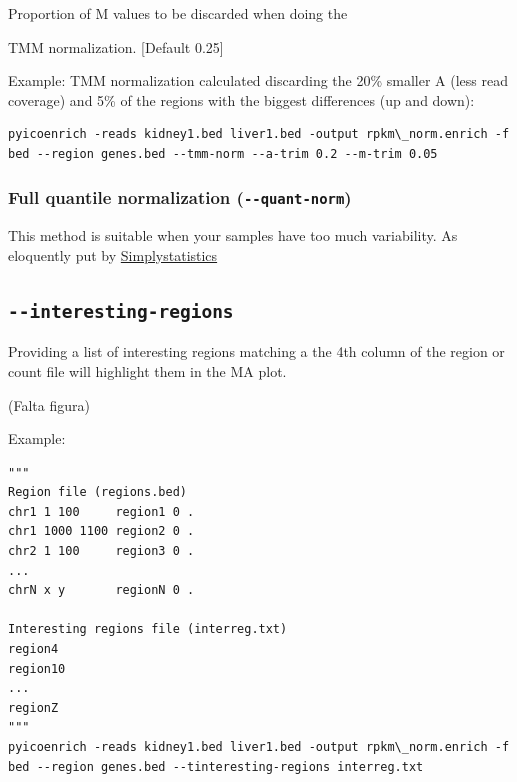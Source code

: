 \documentclass[letterpaper,10pt,english]{sphinxmanual}
\begin{document}

\begin{fulllineitems}
\label{pyicoenrich:cmdoption--m-trim}
Proportion of M values to be discarded when doing the

TMM normalization. {[}Default 0.25{]}

\end{fulllineitems}


Example: TMM normalization calculated discarding the 20\% smaller A (less read coverage) and 5\% of the regions with the biggest differences (up and down):

\begin{Verbatim}[commandchars=\\\{\}]
pyicoenrich -reads kidney1.bed liver1.bed -output rpkm\_norm.enrich -f bed --region genes.bed --tmm-norm --a-trim 0.2 --m-trim 0.05
\end{Verbatim}


\subsubsection{Full quantile normalization (\texttt{-{-}quant-norm})}
\label{pyicoenrich:full-quantile-normalization-quant-norm}
This method is suitable when your samples have too much variability. As eloquently put by \href{http://simplystatistics.org/2013/04/26/mindlessly-normalizing-genomics-data-is-bad-but-ignoring-unwanted-variability-can-be-worse/}{Simplystatistics}


\subsection{\texttt{-{-}interesting-regions}}
\label{pyicoenrich:interesting-regions}\label{pyicoenrich:simplystatistics}
Providing a list of interesting regions matching a the 4th column of the region or count file will highlight them in the MA plot.

(Falta figura)

Example:

\begin{Verbatim}[commandchars=\\\{\}]
"""
Region file (regions.bed)
chr1 1 100     region1 0 .
chr1 1000 1100 region2 0 .
chr2 1 100     region3 0 .
...
chrN x y       regionN 0 .

Interesting regions file (interreg.txt)
region4
region10
...
regionZ
"""
pyicoenrich -reads kidney1.bed liver1.bed -output rpkm\_norm.enrich -f bed --region genes.bed --tinteresting-regions interreg.txt
\end{Verbatim}
\end{document}
